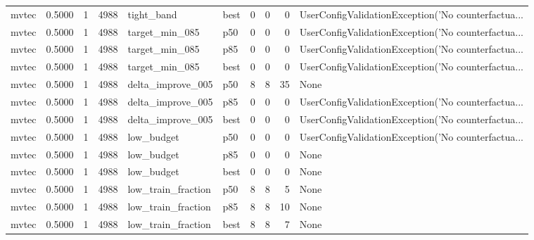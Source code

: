 \begin{tabular}{lrrrllrrrl}
   mvtec &    0.5000 &    1 &   4988 &           tight\_band &   best &               0 &          0 &       0 & UserConfigValidationException('No counterfactua... \\
   mvtec &    0.5000 &    1 &   4988 &       target\_min\_085 &    p50 &               0 &          0 &       0 & UserConfigValidationException('No counterfactua... \\
   mvtec &    0.5000 &    1 &   4988 &       target\_min\_085 &    p85 &               0 &          0 &       0 & UserConfigValidationException('No counterfactua... \\
   mvtec &    0.5000 &    1 &   4988 &       target\_min\_085 &   best &               0 &          0 &       0 & UserConfigValidationException('No counterfactua... \\
   mvtec &    0.5000 &    1 &   4988 &    delta\_improve\_005 &    p50 &               8 &          8 &      35 &                                               None \\
   mvtec &    0.5000 &    1 &   4988 &    delta\_improve\_005 &    p85 &               0 &          0 &       0 & UserConfigValidationException('No counterfactua... \\
   mvtec &    0.5000 &    1 &   4988 &    delta\_improve\_005 &   best &               0 &          0 &       0 & UserConfigValidationException('No counterfactua... \\
   mvtec &    0.5000 &    1 &   4988 &           low\_budget &    p50 &               0 &          0 &       0 & UserConfigValidationException('No counterfactua... \\
   mvtec &    0.5000 &    1 &   4988 &           low\_budget &    p85 &               0 &          0 &       0 &                                               None \\
   mvtec &    0.5000 &    1 &   4988 &           low\_budget &   best &               0 &          0 &       0 &                                               None \\
   mvtec &    0.5000 &    1 &   4988 &   low\_train\_fraction &    p50 &               8 &          8 &       5 &                                               None \\
   mvtec &    0.5000 &    1 &   4988 &   low\_train\_fraction &    p85 &               8 &          8 &      10 &                                               None \\
   mvtec &    0.5000 &    1 &   4988 &   low\_train\_fraction &   best &               8 &          8 &       7 &                                               None \\

\end{tabular}
